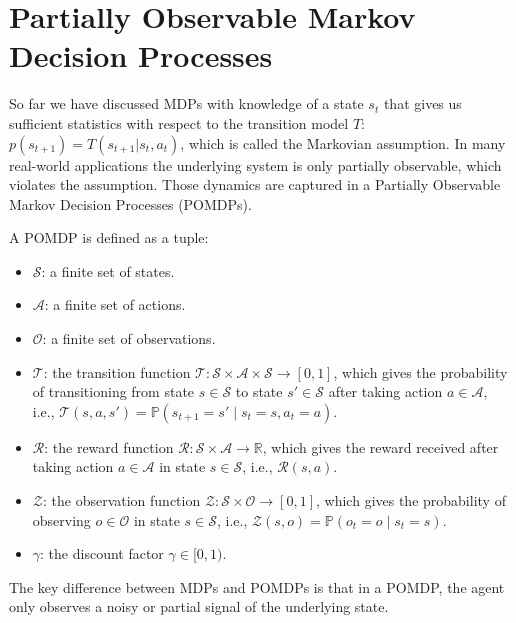 \section{Partially Observable Markov Decision Processes}
\label{POMDP}
So far we have discussed MDPs with knowledge of a state $s_t$ that gives us sufficient statistics with respect to the 
transition model $T$: $p(s_{t+1}) = T(s_{t+1}|s_t, a_t)$, which is called the Markovian assumption. In many real-world applications the underlying system 
is only partially observable, which violates the assumption. Those dynamics are captured in a Partially Observable Markov Decision Processes (POMDPs).

A POMDP is defined as a tuple:

\begin{itemize}
\item $\mathcal{S}$: a finite set of states.
\item $\mathcal{A}$: a finite set of actions.
\item $\mathcal{O}$: a finite set of observations.
\item $\mathcal{T}$: the transition function $\mathcal{T}: \mathcal{S} \times \mathcal{A} \times \mathcal{S} \rightarrow [0, 1]$, which gives the probability of transitioning from state $s \in \mathcal{S}$ to state $s' \in \mathcal{S}$ after taking action $a \in \mathcal{A}$, i.e., $\mathcal{T}(s, a, s') = \mathbb{P}(s_{t+1} = s' \mid s_t = s, a_t = a)$.
\item $\mathcal{R}$: the reward function $\mathcal{R}: \mathcal{S} \times \mathcal{A} \rightarrow \mathbb{R}$, which gives the reward received after taking action $a \in \mathcal{A}$ in state $s \in \mathcal{S}$, i.e., $\mathcal{R}(s, a)$.
\item $\mathcal{Z}$: the observation function $\mathcal{Z}: \mathcal{S} \times \mathcal{O} \rightarrow [0, 1]$, which gives the probability of observing $o \in \mathcal{O}$ in state $s \in \mathcal{S}$, i.e., $\mathcal{Z}(s, o) = \mathbb{P}(o_{t} = o \mid s_t = s)$.
\item $\gamma$: the discount factor $\gamma \in [0, 1)$.
\end{itemize}

The key difference between MDPs and POMDPs is that in a POMDP, the agent only observes a noisy or partial signal of the underlying state.

